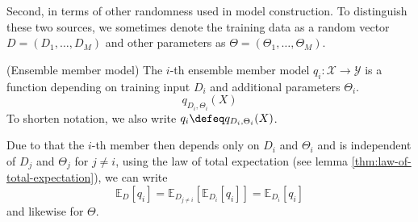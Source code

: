 \documentclass[
	twoside=false, %
]{kaobook}
\begin{document}
Second, in terms of other randomness used in model construction.
To distinguish these two sources, we sometimes denote the training data as a random vector $D = (D_{1}, \dots, D_{M})$ and other parameters as $\Theta = (\Theta_{1}, \dots, \Theta_{M})$. 
\begin{definition} (Ensemble member model) The $i$-th ensemble member model $q_{i}: \mathcal{X} \to \mathcal{Y}$ is a function depending on training input $D_{i}$ and additional parameters $\Theta_{i}$.
$$
q_{D_{i}, \Theta_{i}}(X)
$$
To shorten notation, we also write $q_{i} \defeq  q_{D_{i}, \Theta_{i}}(X)$.
\end{definition}
Due to that the $i$-th member then depends only on $D_{i}$ and $\Theta_{i}$ and is independent of $D_{j}$ and $\Theta_{j}$ for $j \not= i$, using the law of total expectation (see lemma \ref{thm:law-of-total-expectation}), we can write
$$
\mathbb{E}_{D}\left[ q_{i} \right] = \mathbb{E}_{D_{j \not= i}}\left[ \mathbb{E}_{D_{i}}\left[ q_{i} \right]   \right]  = \mathbb{E}_{D_{i}}\left[ q_{i} \right] 
$$
and likewise for $\Theta$. 
\end{document}
